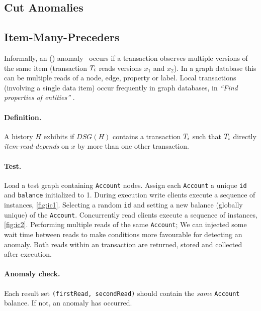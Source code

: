 \subsection{Cut Anomalies}

\subsection*{Item-Many-Preceders}
\label{sec:cut-anomalies}

Informally, an  () 
anomaly~\cite{DBLP:journals/pvldb/BailisDFGHS13} occurs if a transaction observes 
multiple versions of the same item (\eg transaction $T_i$ reads versions 
$x_1$ and $x_2$). In a graph database this can be multiple reads of a node, edge, 
property or label. Local transactions (involving a single data item) occur 
frequently in graph databases, \eg in \emph{``Find properties of entities''} 
.

\paragraph{Definition.}
A history $H$ exhibits  if $\textit{DSG}(H)$ contains a transaction
$T_i$ such that $T_i$ directly \emph{item-read-depends} on $x$ by more
than one other transaction.

\paragraph{Test.}
Load a test graph containing \texttt{Account} nodes. Assign each \texttt{Account} 
a unique \texttt{id} and \texttt{balance} initialized to 1. During execution 
write clients execute a sequence of  instances, \autoref{fig:ic1}.
Selecting a random \texttt{id} and setting a new balance (globally unique) of the 
\texttt{Account}. Concurrently read clients execute a sequence of  
instances, \autoref{fig:ic2}. Performing multiple reads of the same \texttt{Account}; 
We can injected some wait time between reads to make conditions more favourable 
for detecting an anomaly. Both reads within an  
transaction are returned, stored and collected after execution.

\paragraph{Anomaly check.}
Each  result set \texttt{(firstRead, secondRead)} should
contain the \emph{same} \texttt{Account} balance. If not, an  
anomaly has occurred.

